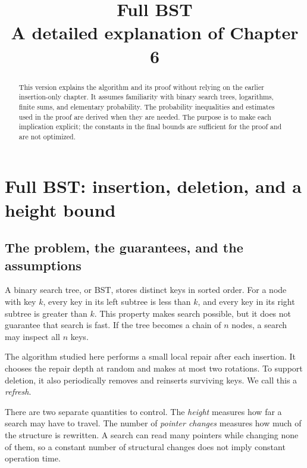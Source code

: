 \documentclass[11pt,a4paper]{article}
\title{Full BST\\[0.4em]\large A detailed explanation of Chapter 6}
\author{}
\date{}
\theoremstyle{readable}
\begin{document}
\maketitle
\begin{abstract}
This version explains the algorithm and its proof without relying on the
earlier insertion-only chapter. It assumes familiarity with binary search
trees, logarithms, finite sums, and elementary probability. The probability
inequalities and estimates used in the proof are derived when they are
needed. The purpose is to make each implication explicit; the constants
in the final bounds are sufficient for the proof and are not optimized.
\end{abstract}
\setcounter{section}{5}
\tableofcontents
\clearpage

\section{Full BST: insertion, deletion, and a height bound}
\label{sec:full}

\subsection{The problem, the guarantees, and the assumptions}

A binary search tree, or BST, stores distinct keys in sorted order.
For a node with key $k$, every key in its left subtree is less than $k$,
and every key in its right subtree is greater than $k$. This property
makes search possible, but it does not guarantee that search is fast.
If the tree becomes a chain of $n$ nodes, a search may inspect all $n$ keys.

The algorithm studied here performs a small local repair after each
insertion. It chooses the repair depth at random and makes at most two
rotations. To support deletion, it also periodically removes and
reinserts surviving keys. We call this a \emph{refresh}.

There are two separate quantities to control. The \emph{height} measures
how far a search may have to travel. The number of \emph{pointer changes}
measures how much of the structure is rewritten. A search can read many
pointers while changing none of them, so a constant number of structural
changes does not imply constant operation time.
\end{document}
